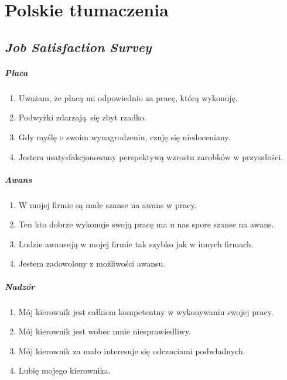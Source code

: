 \appendix
\chapter{Polskie tłumaczenia}

\section{\emph{Job Satisfaction Survey}}
\label{sec:jss-text}
\paragraph{Płaca}
\begin{enumerate}
  \item Uważam, że płacą mi odpowiednio za pracę, którą wykonuję.
  \item Podwyżki zdarzają się zbyt rzadko.
  \item Gdy myślę o swoim wynagrodzeniu, czuję się niedoceniany.
  \item Jestem usatysfakcjonowany perspektywą wzrostu zarobków w przyszłości.
\end{enumerate}

\paragraph{Awans}
\begin{enumerate}
  \item W mojej firmie są małe szanse na awans w pracy.
  \item Ten kto dobrze wykonuje swoją pracę ma u nas spore szanse na awans.
  \item Ludzie awansują w mojej firmie tak szybko jak w innych firmach.
  \item Jestem zadowolony z możliwości awansu.
\end{enumerate}

\paragraph{Nadzór}
\begin{enumerate}
  \item Mój kierownik jest całkiem kompetentny w wykonywaniu swojej pracy.
  \item Mój kierownik jest wobec mnie niesprawiedliwy.
  \item Mój kierownik za mało interesuje się odczuciami podwładnych.
  \item Lubię mojego kierownika.
\end{enumerate}

